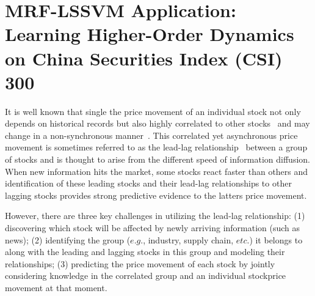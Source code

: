 
\chapter{MRF-LSSVM Application: Learning Higher-Order Dynamics on
  China Securities Index (CSI) 300}
\label{cha:mrf_lssvm_app}
It is well known that single the price movement of an individual
stock not only depends on historical records but also highly
correlated to other
stocks~\cite{lo1990contrarian,mech1993portfolio} and may change
in a non-synchronous
manner~\cite{lo1990contrarian,brennan1993investment}. This
correlated yet asynchronous price movement is sometimes referred
to as the lead-lag relationship~\cite{hou2007industry} between a
group of stocks and is thought to arise from the different speed
of information
diffusion\cite{lo1990contrarian,badrinath1995shepherds,mcqueen1996delayed}.
When new information hits the market, some stocks react faster
than others and identification of these leading stocks and their
lead-lag relationships to other lagging stocks provides strong
predictive evidence to the latter\textquotesingle s price
movement.


However, there are three key challenges in utilizing the lead-lag
relationship: (1) discovering which stock will be affected by
newly arriving information (such as news); (2) identifying the
group ($e.g.$, industry, supply chain, $etc.$) it belongs to along with
the leading and lagging stocks in this group and
modeling their relationships; (3) predicting the price movement of
each stock by jointly considering knowledge in the correlated
group and an individual stock\textquotesingle price movement at
that moment.

